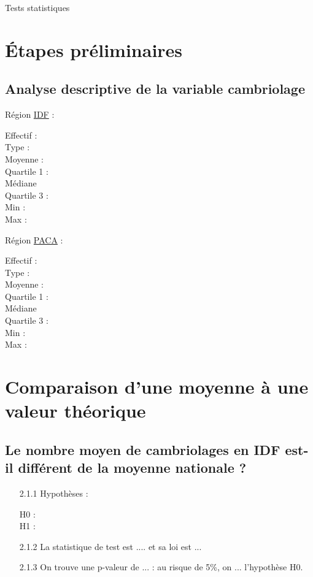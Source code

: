\documentclass{article}
\begin{document}
\begin{center}
    {\Huge Tests statistiques}
\end{center}


\section{Étapes préliminaires}
\subsection{Analyse descriptive de la variable cambriolage}
Région \underline{IDF} :
\begin{description}
    \item[Effectif :]
    \item[Type :] 
    \item[Moyenne :] 
    \item[Quartile 1 :] 
    \item[Médiane] 
    \item[Quartile 3 :] 
    \item[Min :] 
    \item[Max :] 
\end{description}

Région \underline{PACA} :
\begin{description}
	\item[Effectif :]
	\item[Type :] 
	\item[Moyenne :] 
	\item[Quartile 1 :] 
	\item[Médiane] 
	\item[Quartile 3 :] 
	\item[Min :] 
	\item[Max :] 
\end{description}

\section{Comparaison d'une moyenne à une valeur théorique}

\subsection{Le nombre moyen de cambriolages en IDF est-il différent de la moyenne nationale ?}
\begin{itemize}
	\item[2.1.1] Hypothèses : 
\begin{description}
    \item[H0 :]
    \item[H1 :]
\end{description}
 \item[2.1.2] La statistique de test est .... et sa loi est ...

\item[2.1.3] On trouve une p-valeur de ... : au risque de 5\%, on ... l'hypothèse H0.
\end{itemize}
\end{document}
